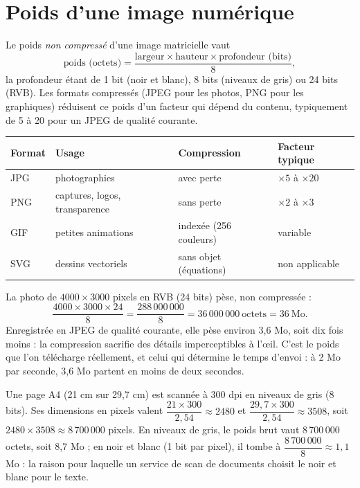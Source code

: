 \section{Poids d'une image numérique}

\begin{methode}
Le poids \emph{non compressé} d'une image matricielle vaut
\[
\text{poids (octets)} = \frac{\text{largeur} \times \text{hauteur} \times \text{profondeur (bits)}}{8},
\]
la profondeur étant de 1 bit (noir et blanc), 8 bits (niveaux de gris) ou 24 bits (RVB). Les formats compressés (JPEG pour les photos, PNG pour les graphiques) réduisent ce poids d'un facteur qui dépend du contenu, typiquement de 5 à 20 pour un JPEG de qualité courante.
\end{methode}

\begin{center}
\small
\begin{tabular}{L{2.2cm}L{4.6cm}L{3.6cm}L{3.4cm}}
\toprule
{}\textbf{Format} & \textbf{Usage} & \textbf{Compression} & \textbf{Facteur typique}\\
\midrule
JPG & photographies & avec perte & $\times 5$ à $\times 20$\\
PNG & captures, logos, transparence & sans perte & $\times 2$ à $\times 3$\\
GIF & petites animations & indexée (256 couleurs) & variable\\
SVG & dessins vectoriels & sans objet (équations) & non applicable\\
\bottomrule
\end{tabular}
\label{ch6:tab:compression}
\end{center}

\begin{exemple}
La photo de $4000 \times 3000$ pixels en RVB (24 bits) pèse, non compressée :
\[
\frac{4000 \times 3000 \times 24}{8} = \frac{288\,000\,000}{8} = 36\,000\,000\ \text{octets} = 36\ \text{Mo} .
\]
Enregistrée en JPEG de qualité courante, elle pèse environ 3{,}6 Mo, soit dix fois moins : la compression sacrifie des détails imperceptibles à l'œil. C'est le poids que l'on télécharge réellement, et celui qui détermine le temps d'envoi : à 2 Mo par seconde, 3{,}6 Mo partent en moins de deux secondes.
\end{exemple}

\begin{exemple}
Une page A4 (21 cm sur 29{,}7 cm) est scannée à 300 dpi en niveaux de gris (8 bits). Ses dimensions en pixels valent $\dfrac{21 \times 300}{2{,}54} \approx 2480$ et $\dfrac{29{,}7 \times 300}{2{,}54} \approx 3508$, soit $2480 \times 3508 \approx 8\,700\,000$ pixels. En niveaux de gris, le poids brut vaut $8\,700\,000$ octets, soit 8{,}7 Mo ; en noir et blanc (1 bit par pixel), il tombe à $\dfrac{8\,700\,000}{8} \approx 1{,}1$ Mo : la raison pour laquelle un service de scan de documents choisit le noir et blanc pour le texte.
\end{exemple}


